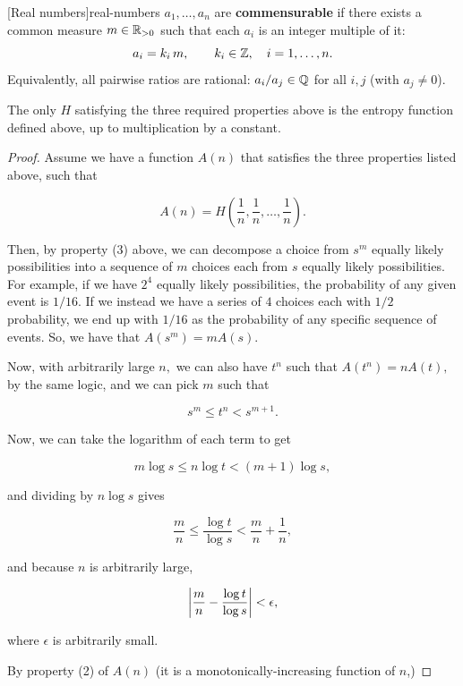 \documentclass{article}
\begin{document}
\begin{definition}[Commensurable]
\@[Real numbers]{real-numbers} $a_1, \dots, a_n$ are \textbf{commensurable} if there exists a common measure $m \in \mathbb{R}_{>0}$ such that each $a_i$ is an \@{integer} multiple of it:
\[ a_i = k_i\, m, \qquad k_i \in \mathbb{Z}, \quad i = 1, \dots, n. \]
Equivalently, all pairwise ratios are rational: $a_i / a_j \in \mathbb{Q}$ for all $i, j$ (with $a_j \neq 0$).
\end{definition}

\begin{theorem}
The only $H$ satisfying the three required properties above is the \@{entropy} function defined above, up to multiplication by a constant.
\end{theorem}

\begin{proof}
Assume we have a function $A(n)$ that satisfies the three properties listed above, such that

\[ A(n) = H(\frac{1}{n}, \frac{1}{n}, \dots, \frac{1}{n}). \]

Then, by property (3) above, we can decompose a choice from $s^m$ equally likely possibilities into a sequence of $m$ choices each from $s$ equally likely possibilities. For example, if we have $2^4$ equally likely possibilities, the probability of any given event is $1/16$. If we instead we have a series of $4$ choices each with $1/2$ probability, we end up with $1/16$ as the probability of any specific sequence of events. So, we have that $A(s^m) = m A(s).$

Now, with arbitrarily large $n,$ we can also have $t^n$ such that $A(t^n) = nA(t),$ by the same logic, and we can pick $m$ such that

\[ s^m \leq t^n < s^{m+1}. \]

Now, we can take the logarithm of each term to get

\[ m \log{s} \leq n \log{t} < (m+1)\log{s}, \]

and dividing by $n \log{s}$ gives

\[ \frac{m}{n} \leq \frac{\log{t}}{\log{s}} < \frac{m}{n} + \frac{1}{n}, \]

and because $n$ is arbitrarily large, 

\[ \left| \frac{m}{n} - \frac{\log{t}}{\log{s}} \right| < \epsilon, \]

where $\epsilon$ is arbitrarily small.

By property (2) of $A(n)$ (it is a \@{monotonically-increasing} function of $n$,)  


\end{proof}
\end{document}
